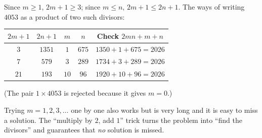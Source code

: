 {
Since $m\ge1$, $2m+1\ge3$; since $m\le n$, $2m+1\le2n+1$. The ways of writing $4053$ as a product of two such divisors:
\begin{center}\begin{tabular}{|c|c|c|c|c|}\hline
$2m+1$ & $2n+1$ & $m$ & $n$ & Check $2mn+m+n$\\\hline
$3$ & $1351$ & $1$ & $675$ & $1350+1+675=2026$\\\hline
$7$ & $579$ & $3$ & $289$ & $1734+3+289=2026$\\\hline
$21$ & $193$ & $10$ & $96$ & $1920+10+96=2026$\\\hline
\end{tabular}\end{center}
(The pair $1\times4053$ is rejected because it gives $m=0$.)
\begin{warnbox}Trying $m=1,2,3,\dots$ one by one also works but is very long and it is easy to miss a solution. The ``multiply by $2$, add $1$''
trick turns the problem into ``find the divisors'' and guarantees that \emph{no} solution is missed.\end{warnbox}
}

